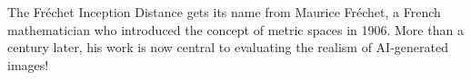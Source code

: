 \clearpage

\thispagestyle{customstyle}

{The Fréchet Inception Distance gets its name from Maurice Fréchet, a French mathematician who introduced the concept of metric spaces in 1906.
More than a century later, his work is now central to evaluating the realism of AI-generated images!}